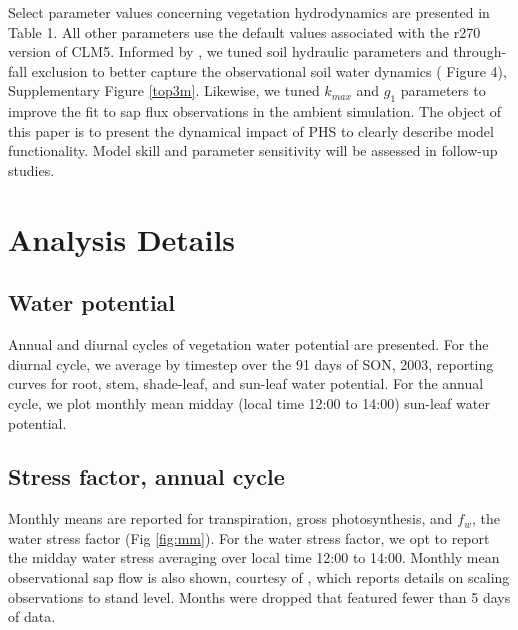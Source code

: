 \documentclass[draft,linenumbers]{agujournal}
\begin{document}
Select parameter values concerning vegetation hydrodynamics are presented in Table 1.
All other parameters use the default values associated with the r270 version of CLM5.
Informed by \cite{fisher2008}, we tuned soil hydraulic parameters and through-fall exclusion to better capture the observational soil water dynamics (\cite{fisher2007} Figure 4), Supplementary Figure \ref{top3m}.
Likewise, we tuned $k_{max}$ and $g_1$ parameters to improve the fit to sap flux observations in the ambient simulation.
The object of this paper is to present the dynamical impact of PHS to clearly describe model functionality. Model skill and parameter sensitivity will be assessed in follow-up studies.

\section{Analysis Details}  
\subsection{Water potential}

Annual and diurnal cycles of vegetation water potential are presented.
For the diurnal cycle, we average by timestep over the 91 days of SON, 2003, reporting curves for root, stem, shade-leaf, and sun-leaf water potential.
For the annual cycle, we plot monthly mean midday (local time 12:00 to 14:00) sun-leaf water potential.

\subsection{Stress factor, annual cycle}
    Monthly means are reported for transpiration, gross photosynthesis, and $f_w$, the water stress factor (Fig \ref{fig:mm}).
    For the water stress factor, we opt to report the midday water stress averaging over local time 12:00 to 14:00.
    Monthly mean observational sap flow is also shown, courtesy of \cite{fisher2007}, which reports details on scaling observations to stand level.
    Months were dropped that featured fewer than 5 days of data.
\end{document}
